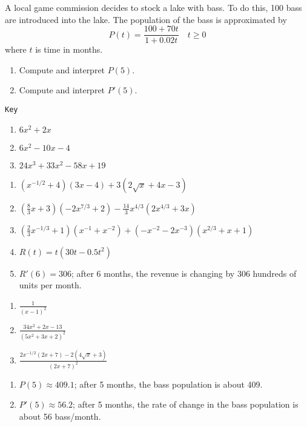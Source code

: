 \documentclass{article}
\newcounter{pset}
\newcounter{key}
\begin{document}
A local game commission decides to stock a lake with bass. To do this, 100 bass are introduced into the lake. The population of the bass is approximated by
\[
P(t) = \frac{100+70t}{1+0.02t} \quad t \geq 0
\]
where $t$ is time in months.
\begin{enumerate}   \setcounter{enumi}{\value{pset}}
    \item Compute and interpret $P(5)$.
    \item Compute and interpret $P'(5)$.
\end{enumerate} 




\vfill

\dotfill \newline

\texttt{Key}
\begin{multicols}{3}
\begin{enumerate}
    \item $6x^2 + 2x$
    \item $6x^2 - 10x - 4$
    \item $24x^3 + 33x^2 - 58x + 19$
\end{enumerate} \setcounter{key}{\value{enumi}}
\end{multicols}
\begin{enumerate}   \setcounter{enumi}{\value{key}}
    \item $(x^{-1/2}+4)(3x-4)+3(2\sqrt{x}+4x-3)$
    \item $\left(\frac{8}{3}x+3\right)\left(-2x^{7/3}+2\right)-\frac{14}{3}x^{4/3}\left(2x^{4/3}+3x\right)$
    \item $\left(\frac{2}{3}x^{-1/3}+1\right)\left(x^{-1}+x^{-2}\right)+\left(-x^{-2}-2x^{-3}\right)\left(x^{2/3}+x+1\right)$
    \item $R(t) = t(30t-0.5t^2)$
    \item $R'(6) = 306$; after 6 months, the revenue is changing by 306 hundreds of units per month.
\end{enumerate} \setcounter{key}{\value{enumi}}
\begin{multicols}{3}
\begin{enumerate}   \setcounter{enumi}{\value{key}}
    \item $\frac{1}{(x-1)^2}$
    \item $\frac{34x^2+2x-13}{(5x^2+3x+2)^2}$
    \item $\frac{2x^{-1/2}(2x+7)-2(4\sqrt{x}+3)}{(2x+7)^2}$
\end{enumerate} \setcounter{key}{\value{enumi}}
\end{multicols}
\begin{enumerate}   \setcounter{enumi}{\value{key}}
    \item $P(5) \approx 409.1$; after 5 months, the bass population is about 409.
    \item $P'(5) \approx 56.2$; after 5 months, the rate of change in the bass population is about 56 bass/month.
\end{enumerate} \setcounter{key}{\value{enumi}}
\end{document}
